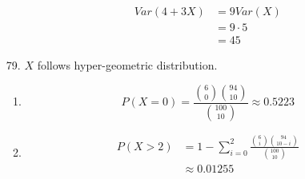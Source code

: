 \documentclass{article}
\begin{document}
\begin{itemize}
\begin{enumerate}[label=(\alph*)]
    \begin{equation*}
      \begin{split}
        Var(4+3X)
        &= 9Var(X)\\
        &= 9 \cdot 5\\
        &= 45
      \end{split}
    \end{equation*}
  \end{enumerate}
\item [79.]
  $X$ follows hyper-geometric distribution.
  \begin{enumerate}[label=(\alph*)]
  \item
    \begin{equation*}
      P(X=0) = \frac{{6 \choose 0} {94 \choose 10}}{{100 \choose 10}} \approx 0.5223
    \end{equation*}
  \item
    \begin{equation*}
      \begin{split}
        P(X > 2)
        &= 1 - \sum_{i=0}^2\frac{{6 \choose i}{94 \choose 10 - i}}{{100 \choose 10}}\\
        &\approx 0.01255
      \end{split}
    \end{equation*}

  \end{enumerate}
\end{itemize}
\end{document}
